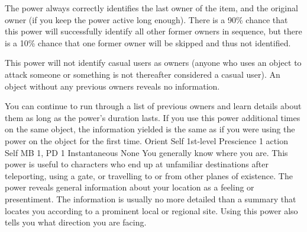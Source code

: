 The power always correctly identifies the last owner of the item,
and the original owner
(if you keep the power active long enough).
There is a 90\% chance
that this power will successfully identify all other former owners
in sequence,
but there is a 10\% chance that one former owner
will be skipped and thus not identified.

This power will not identify casual users as owners
(anyone who uses an object to attack someone
or something is not thereafter considered a casual user).
An object without any previous owners reveals no information.

You can continue to run through a list of previous owners
and learn details about them as long as the power's duration lasts.
If you use this power additional times on the same object,
the information yielded is the same
as if you were using the power on the object for the first time.
\DndPowerHeader%
    {Orient Self\label{pwr:orient_self}}
    {1st-level Prescience}
    {1 action}
    {Self}
    {MB 1, PD 1}
    {Instantaneous}
    {None}
You generally know where you are. This power
is useful to characters who end up at unfamiliar destinations
after teleporting, using a gate, or travelling to or from
other planes of existence. The power reveals general information
about your location as a feeling or presentiment. The information
is usually no more detailed than a summary that locates you
according to a prominent local or regional site. Using this
power also tells you what direction you are facing.

